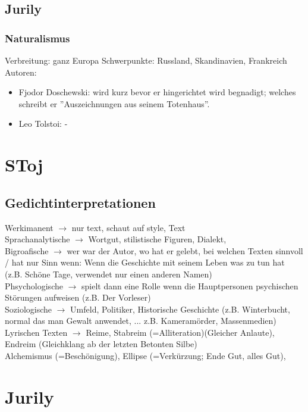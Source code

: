 \documentclass[a4paper]{article}
\begin{document}
\subsection{Jurily}

\subsubsection{Naturalismus}

Verbreitung: ganz Europa
Schwerpunkte: Russland, Skandinavien, Frankreich
Autoren: 
\begin{itemize}
\item Fjodor Doschewski: wird kurz bevor er hingerichtet wird begnadigt; welches schreibt er ''Auszeichnungen aus seinem Totenhaus''. 
\item Leo Tolstoi: -
\end{itemize}

\section{SToj}

\subsection{Gedichtinterpretationen}

Werkimanent $\rightarrow$ nur text, schaut auf style, Text\\
Sprachanalytische $\rightarrow$ Wortgut, stilistische Figuren, Dialekt,\\
Bigroafische $\rightarrow$ wer war der Autor, wo hat er gelebt, bei welchen Texten sinnvoll / hat nur Sinn wenn: Wenn die Geschichte mit seinem Leben was zu tun hat (z.B. Schöne Tage, verwendet nur einen anderen Namen)\\
Phsychologische $\rightarrow$ spielt dann eine Rolle wenn die Hauptpersonen psychischen Störungen aufweisen (z.B. Der Vorleser)\\
Soziologische $\rightarrow$ Umfeld, Politiker, Historische Geschichte (z.B. Winterbucht, normal das man Gewalt anwendet, ... z.B. Kameramörder, Massenmedien)
\newline
Lyrischen Texten $\rightarrow$ Reime, Stabreim (=Alliteration)(Gleicher Anlaute), Endreim (Gleichklang ab der letzten Betonten Silbe)\\
Alchemismus (=Beschönigung), Ellipse (=Verkürzung; Ende Gut, alles Gut), \\

\section{Jurily}
\end{document}
